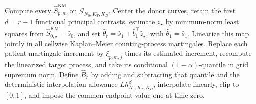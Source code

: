 Compute every \(\widehat S^{\mathrm{KM}}_{p,m}\) on \(\mathcal G_{N_0,K_T,K_D}\). Center the donor curves, retain the first \(d=r-1\) functional principal contrasts, estimate \(z_\star\) by minimum-norm least squares from \(\widehat S^{\mathrm{KM}}_{0,\star}-\widehat s_0\), and set \(\widehat\theta_r=\widehat s_1+\widehat b_1^\top\widehat z_\star\), with \(\widehat\theta_1=\widehat s_1\). Linearize this map jointly in all cellwise Kaplan--Meier counting-process martingales. Replace each patient martingale increment by \(\xi_{p,m,j}\) times its estimated increment, recompute the linearized target process, and take its conditional \((1-\alpha)\)-quantile in grid supremum norm. Define \(\widehat B_r\) by adding and subtracting that quantile and the deterministic interpolation allowance \(Lh_{N_0,K_T,K_D}^\beta\), interpolate linearly, clip to \([0,1]\), and impose the common endpoint value one at time zero.